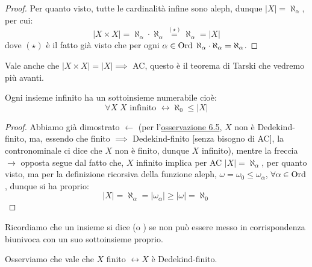 \begin{proof}
	Per quanto visto, tutte le cardinalità infine sono aleph, dunque $|X| = \aleph_\alpha$, per cui:
	\[ |X \times X| = \aleph_\alpha \cdot \aleph_\alpha \overset{(\star)}{=} \aleph_\alpha = |X|
		\]
	dove $(\star)$ è il fatto già visto che per ogni $\alpha \in \operatorname{Ord} \; \aleph_\alpha \cdot \aleph_\alpha = \aleph_\alpha$.
\end{proof}

\begin{note}
	Vale anche che $|X \times X| = |X| \implies$ AC, questo è il teorema di Tarski che vedremo più avanti.
\end{note}


\begin{corollary}
	Ogni insieme infinito ha un sottoinsieme numerabile cioè:
	\[ \forall X \; \text{$X$ infinito $\leftrightarrow \aleph_0 \leq |X|$}
		\]
\end{corollary}

\begin{proof}
	Abbiamo già dimostrato $\leftarrow$ (per l'\hyperref[omega_Dedekind_finito]{osservazione 6.5}, $X$ non è Dedekind-finito, ma, essendo che finito $\implies$ Dedekind-finito [senza bisogno di AC],
	la contronominale ci dice che $X$ non è finito, dunque $X$ infinito), mentre la freccia $\rightarrow$ opposta segue dal fatto che, $X$ infinito implica per AC $|X| = \aleph_\alpha$, per quanto visto,
	ma per la definizione ricorsiva della funzione aleph, $\omega = \omega_0 \leq \omega_\alpha$, $\forall \alpha \in \operatorname{Ord}$, dunque si ha proprio:
	\[ |X| = \aleph_\alpha = |\omega_\alpha| \geq |\omega| = \aleph_0
		\]
\end{proof}

Ricordiamo che un insieme si dice  (o ) se non può essere messo in corrispondenza biunivoca con un suo sottoinsieme proprio.

\begin{proposition}
	Osserviamo che vale che $X$ finito $\leftrightarrow X$ è Dedekind-finito.
\end{proposition}

